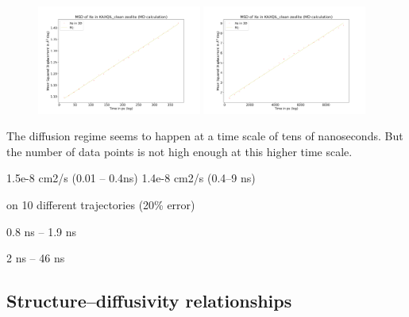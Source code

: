 \documentclass[main]{subfiles}
\begin{document}
\begin{figure}[ht]
  \centering
\includegraphics[width=0.48\textwidth]{figures/5-diffusion/MSD_Xe_coeff_KAXQIL_clean_1.pdf}
\includegraphics[width=0.48\textwidth]{figures/5-diffusion/MSD_Xe_coeff_KAXQIL_clean_2.pdf}
\caption{}\label{fgr:MSD_linear_init}
\end{figure}

The diffusion regime seems to happen at a time scale of tens of nanoseconds. But the number of data points is not high enough at this higher time scale. 

1.5e-8 cm2/s (0.01 -- 0.4ns)
1.4e-8 cm2/s (0.4--9 ns)



 on 10 different trajectories (20\% error)


0.8 ns -- 1.9 ns

2 ns -- 46 ns








\subsection{Structure--diffusivity relationships}
\end{document}

